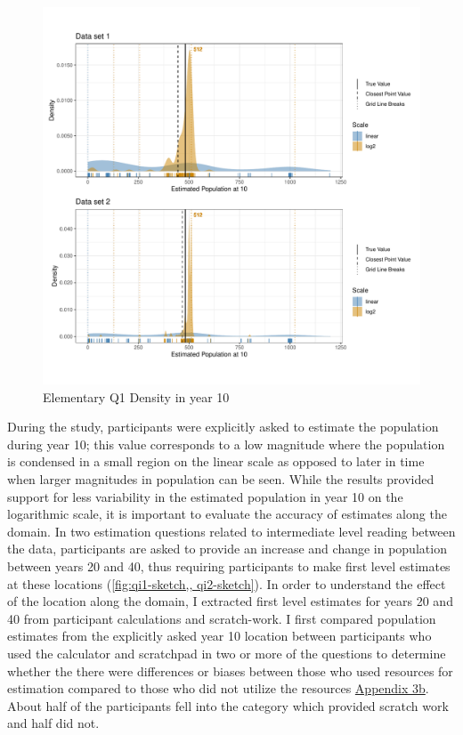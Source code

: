 \documentclass[print]{nuthesis}
\begin{document}
\begin{figure}[tbp]

{\centering \includegraphics[width=1\linewidth,]{thesis_files/figure-latex/qe1-density-plot-10-all-1} 

}

\caption{Elementary Q1 Density in year 10}\label{fig:qe1-density-plot-10-all}
\end{figure}

During the study, participants were explicitly asked to estimate the population during year 10; this value corresponds to a low magnitude where the population is condensed in a small region on the linear scale as opposed to later in time when larger magnitudes in population can be seen.
While the results provided support for less variability in the estimated population in year 10 on the logarithmic scale, it is important to evaluate the accuracy of estimates along the domain.
In two estimation questions related to intermediate level reading between the data, participants are asked to provide an increase and change in population between years 20 and 40, thus requiring participants to make first level estimates at these locations (\cref{fig:qi1-sketch,, qi2-sketch}).
In order to understand the effect of the location along the domain, I extracted first level estimates for years 20 and 40 from participant calculations and scratch-work.
I first compared population estimates from the explicitly asked year 10 location between participants who used the calculator and scratchpad in two or more of the questions to determine whether the there were differences or biases between those who used resources for estimation compared to those who did not utilize the resources \protect\hyperlink{estimation-comparison}{Appendix 3b}.
About half of the participants fell into the category which provided scratch work and half did not.
\end{document}
